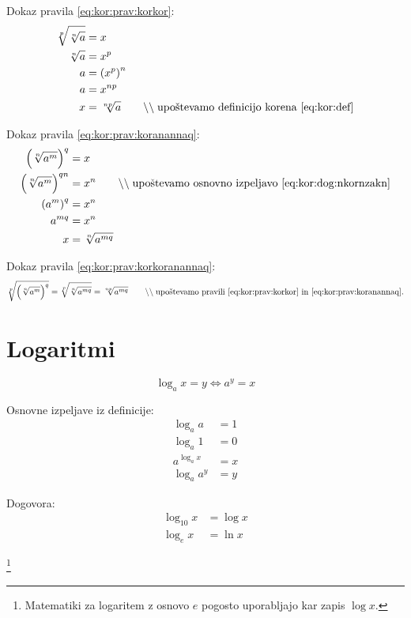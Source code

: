 \documentclass[a4paper,oneside,12pt,fleqn]{article}
\newcommand{\comment}[1]{\ensuremath{\qquad\backslash\backslash\;}\textnormal{#1}}
\renewcommand\iff\Leftrightarrow
\numberwithin{equation}{section}
\begin{document}
Dokaz pravila \ref{eq:kor:prav:korkor}:
\begin{align*}
   \sqrt[p]{\sqrt[n]{a}} &= x \\
   \sqrt[n]{a} &= x^p \\
   a &= \left( x^p \right)^n \\
   a &= x^{np} \\
   x &= \sqrt[np]{a} \comment{upoštevamo definicijo korena \eqref{eq:kor:def}}
\end{align*}

Dokaz pravila \ref{eq:kor:prav:koranannaq}:
\begin{align*}
  \left( \sqrt[n]{a^m} \right)^q &= x \\
  \left( \sqrt[n]{a^m} \right)^{qn} &= x^n \comment{upoštevamo osnovno izpeljavo \eqref{eq:kor:dog:nkornzakn}} \\
  \left( a^m \right)^q &= x^n \\
  a^{mq} &= x^n \\
  x &= \sqrt[n]{a^{mq}}
\end{align*}

Dokaz pravila \ref{eq:kor:prav:korkoranannaq}:
\[  \sqrt[p]{\left( \sqrt[n]{a^m} \right)^q} = \sqrt[p]{\sqrt[n]{a^{mq}}} =
\sqrt[np]{a^{mq}} \comment{upoštevamo pravili \eqref{eq:kor:prav:korkor} in
\eqref{eq:kor:prav:koranannaq}.} \]

\section{Logaritmi}
\label{sec:log}
\begin{equation}
  \label{eq:log:def}
  \log_a\! x = y \iff a^y = x 
\end{equation}

Osnovne izpeljave iz definicije:
\begin{align}
  \log_a\! a &= 1 \label{eq:log:logaaje1} \\
  \log_a\! 1 &= 0 \label{eq:log:log1je0} \\
  a^{\log_a\! x} &= x \label{eq:log:analogax} \\
  \log_a\! a^y &= y \label{eq:log:logaanay}
\end{align}

Dogovora:
\begin{align*}
  \log_{10}\!x &= \log x \\
  \log_{e}\!x &= \ln x
\end{align*}

\vspace{-24pt}
\hspace{100pt}
\footnote{Matematiki za logaritem z osnovo $e$ pogosto uporabljajo
kar zapis $\log x$.}
\end{document}

